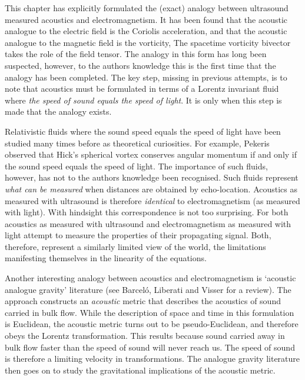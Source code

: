 \documentclass[10pt, fleqn,final,showtrims,oldfontcommands]{article} %
\begin{document}
This  chapter has explicitly formulated the (exact) analogy between ultrasound measured acoustics 
and electromagnetism.
It has been found that the acoustic analogue to the electric field is the Coriolis acceleration,
and that the acoustic analogue to the magnetic field is the vorticity,
The spacetime vorticity bivector takes the role of the field tensor.
The analogy in this form has long been suspected\cite{Marmanis2000,Sridhar1998},
however, to the authors knowledge this is the first time that the analogy has been  completed.
The key step, missing in previous attempts, 
is to note that acoustics must be formulated in terms of a Lorentz invariant fluid where
{\em the speed of sound equals the speed of light}.
It is only when this step is made that the analogy exists.

Relativistic fluids where the sound speed equals the speed of light have been studied many times before
as theoretical curiosities\cite{Taub1978,Pekeris1977}.
For example, Pekeris observed that Hick's spherical vortex conserves angular momentum if and only if
the sound speed equals the speed of light\cite{Pekeris1977}.
The importance of such fluids, however, has not to the authors knowledge been recognised.
Such fluids represent {\em what can be measured} when distances are obtained by echo-location.
Acoustics as measured with ultrasound is therefore {\em identical} to electromagnetism (as measured with light).
With hindsight this correspondence is not too surprising.
For both acoustics as measured with ultrasound and electromagnetism as measured with light 
attempt to measure the properties of their propagating signal.
Both, therefore, 
represent a similarly limited view of the world,
the limitations manifesting themselves in the linearity of the equations.

Another interesting analogy between acoustics and electromagnetism is `acoustic analogue gravity' literature (see Barcel{\'o}, Liberati and Visser\cite{Barcelo2005} for a review).
The approach constructs an {\em acoustic} metric that describes the acoustics of sound carried in bulk flow.
While the description of space and time in this formulation is Euclidean, the acoustic metric turns out to be pseudo-Euclidean,
and therefore obeys the Lorentz transformation.
This results because sound carried away in bulk flow  faster than the speed of sound will never reach us.
The speed of sound is  therefore a limiting velocity in transformations.
The analogue gravity literature then goes on to study the gravitational implications of the acoustic metric.
\end{document}
